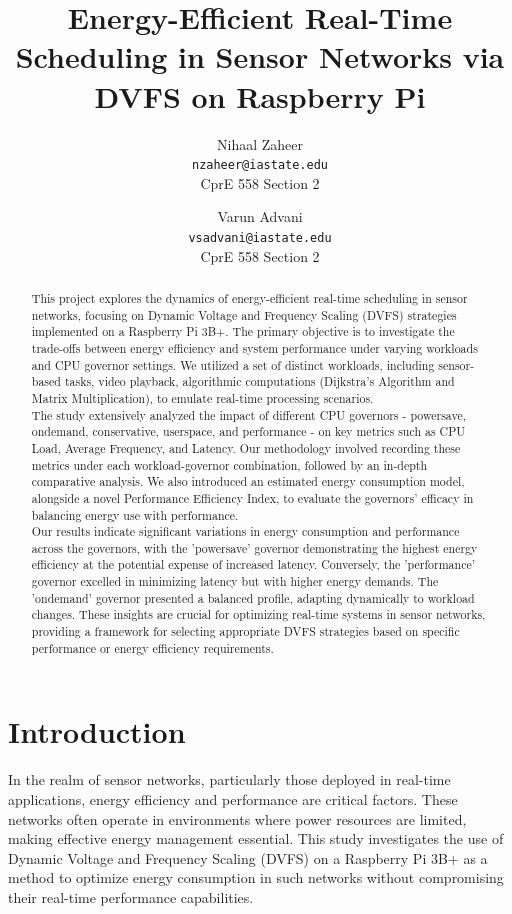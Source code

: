 \documentclass[conference]{IEEEtran}
\title{\textbf{Energy-Efficient Real-Time Scheduling in Sensor Networks via DVFS on Raspberry Pi}}
\author{
    Nihaal Zaheer \\
    \texttt{nzaheer@iastate.edu} \\
    CprE 558 Section 2
    \and
    Varun Advani \\
    \texttt{vsadvani@iastate.edu} \\
    CprE 558 Section 2
}
\date{}
\begin{document}
\maketitle

\begin{abstract}
\normalsize
This project explores the dynamics of energy-efficient real-time scheduling in sensor networks, focusing on Dynamic Voltage and Frequency Scaling (DVFS) strategies implemented on a Raspberry Pi 3B+. The primary objective is to investigate the trade-offs between energy efficiency and system performance under varying workloads and CPU governor settings. We utilized a set of distinct workloads, including sensor-based tasks, video playback, algorithmic computations (Dijkstra's Algorithm and Matrix Multiplication), to emulate real-time processing scenarios. \\
The study extensively analyzed the impact of different CPU governors - powersave, ondemand, conservative, userspace, and performance - on key metrics such as CPU Load, Average Frequency, and Latency. Our methodology involved recording these metrics under each workload-governor combination, followed by an in-depth comparative analysis. We also introduced an estimated energy consumption model, alongside a novel Performance Efficiency Index, to evaluate the governors' efficacy in balancing energy use with performance.\\
Our results indicate significant variations in energy consumption and performance across the governors, with the 'powersave' governor demonstrating the highest energy efficiency at the potential expense of increased latency. Conversely, the 'performance' governor excelled in minimizing latency but with higher energy demands. The 'ondemand' governor presented a balanced profile, adapting dynamically to workload changes. These insights are crucial for optimizing real-time systems in sensor networks, providing a framework for selecting appropriate DVFS strategies based on specific performance or energy efficiency requirements.
\end{abstract}
\section{Introduction}
In the realm of sensor networks, particularly those deployed in real-time applications, energy efficiency and performance are critical factors. These networks often operate in environments where power resources are limited, making effective energy management essential. This study investigates the use of Dynamic Voltage and Frequency Scaling (DVFS) on a Raspberry Pi 3B+ as a method to optimize energy consumption in such networks without compromising their real-time performance capabilities.
\end{document}
